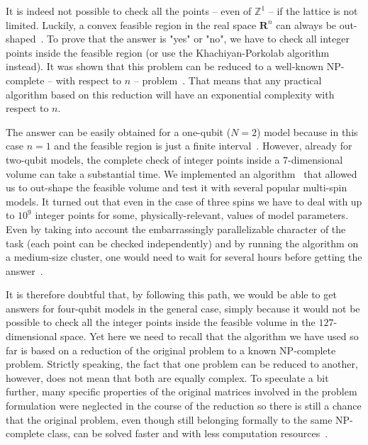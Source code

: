\documentclass[%
 aip,
 floatfix,
 amsmath,amssymb,
 reprint,%
]{revtex4-1}
\begin{document}
It is indeed not possible to check all the  points -- even of $\mathbb{Z}^1$ -- if the lattice is not limited. Luckily, a convex feasible region in the real space $\mathbf{R}^n$ can always be out-shaped~\cite{X1}. To prove that the answer is "yes" or "no", we have to check all integer points inside the feasible region (or use the Khachiyan-Porkolab algorithm~\cite{Ellipsoid} instead). It was shown that this  problem can be reduced to a well-known NP-complete -- with respect to $n$ -- problem~\cite{X2}. That means that any practical algorithm based on this reduction will have an exponential complexity with respect to $n$.


The answer can be  easily obtained for a one-qubit ($N=2$) model because in this case $n=1$ and the feasible region is just a finite interval~\cite{X2,X3,X8}. However, already for two-qubit models, the complete check of integer points inside a $7$-dimensional volume can take a substantial time. We implemented an algorithm~\cite{unpub} that allowed us to out-shape the feasible volume and test it with several popular multi-spin models. It turned out that even in the case  of three spins  we have to deal with up to $10^9$ integer points for some, physically-relevant, values of model parameters. Even by taking into account the embarrassingly parallelizable character of the task (each point can be checked independently) and by running the algorithm on a medium-size cluster, one would need to wait for several hours before getting the answer~\cite{unpub}.


It is therefore doubtful that, by following this path, we would be able to get answers for four-qubit models in the general case, simply because it would not be possible to check all the integer points inside the feasible volume in the $127$-dimensional space. Yet here we need to recall that the algorithm we have used so far is based on a reduction of the original problem to a known NP-complete problem. Strictly speaking, the fact that one problem can be reduced to another, however, does not mean that both are equally complex. To speculate a bit further, many specific properties of the original matrices involved in the problem formulation were neglected in the course of the reduction so there is  still a chance that the original problem, even though still belonging formally to the same NP-complete class, can be solved faster and with less computation resources~\cite{parameter}.
 
\end{document}
